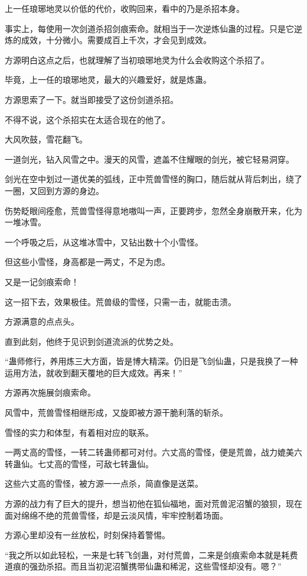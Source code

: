 \begin{this_body}
上一任琅琊地灵以价低的代价，收购回来，看中的乃是杀招本身。

事实上，每使用一次剑道杀招剑痕索命。就相当于一次逆炼仙蛊的过程。只是它逆炼的成效，十分微小。需要成百上千次，才会见到成效。

方源明白这点之后，也就理解了当初琅琊地灵为什么会收购这个杀招了。

毕竟，上一任的琅琊地灵，最大的兴趣爱好，就是炼蛊。

方源思索了一下。就当即接受了这份剑道杀招。

不得不说，这个杀招实在太适合现在的他了。

大风吹鼓，雪花翻飞。

一道剑光，钻入风雪之中。漫天的风雪，遮盖不住耀眼的剑光，被它轻易洞穿。

剑光在空中划过一道优美的弧线，正中荒兽雪怪的胸口，随后就从背后刺出，绕了一圈，又回到方源的身边。

伤势眨眼间痊愈，荒兽雪怪得意地嗷叫一声，正要跨步，忽然全身崩散开来，化为一堆冰雪。

一个呼吸之后，从这堆冰雪中，又钻出数十个小雪怪。

但这些小雪怪，身高都是一两丈，不足为虑。

又是一记剑痕索命！

这一招下去，效果极佳。荒兽级的雪怪，只需一击，就能击溃。

方源满意的点点头。

直到此刻，他终于见识到剑道流派的优势之处。

“蛊师修行，养用炼三大方面，皆是博大精深。仍旧是飞剑仙蛊，只是我换了一种运用方法，就收到翻天覆地的巨大成效。再来！”

方源再次施展剑痕索命。

风雪中，荒兽雪怪相继形成，又旋即被方源干脆利落的斩杀。

雪怪的实力和体型，有着相对应的联系。

一两丈高的雪怪，一转二转蛊师都可对付。六丈高的雪怪，便是荒兽，战力媲美六转蛊仙。七丈高的雪怪，可敌七转蛊仙。

这些六丈高的雪怪，被方源一一点杀，简直像是送菜。

方源的战力有了巨大的提升，想当初他在狐仙福地，面对荒兽泥沼蟹的狼狈，现在面对绵绵不绝的荒兽雪怪，却是云淡风情，牢牢控制着场面。

方源心里却没有一丝放松，时刻保持着警惕。

“我之所以如此轻松，一来是七转飞剑蛊，对付荒兽，二来是剑痕索命本就是耗费道痕的强劲杀招。而且当初泥沼蟹携带仙蛊和稀泥，这些雪怪却没有。嗯？”


\end{this_body}
